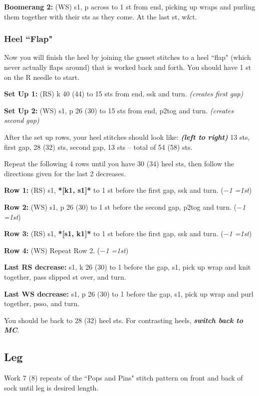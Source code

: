 \documentclass[12pt]{article}
\newcommand{\vocab}[1]{\emph{\textbf{#1}}} %
\newcommand{\rowDir}[1]{\textbf{#1:}} %
\renewcommand{\repeat}[1]{\textbf{*[#1]*}} %
\newcommand{\decrease}[1]{(\emph{$-$#1
	\ifnum#1=1{st}\else{sts}\fi})}
\begin{document}
\begin{multicols}{2}
\rowDir{Boomerang 2} (WS) s1, p across to 1 st from end, picking up wraps and purling them together with their sts as they come. At the last st, w\&t.

\subsubsection*{Heel ``Flap"}
\vspace{-.5em}
Now you will finish the heel by joining the gusset stitches to a heel ``flap" (which never actually flaps around) that is worked back and forth. You should have 1 st on the R needle to start. 

\rowDir{Set Up 1} (RS) k 40 (44) to 15 sts from end, ssk and turn. \emph{(creates first gap)}

\rowDir{Set Up 2} (WS) s1, p 26 (30) to 15 sts from end, p2tog and turn. \emph{(creates second gap)}

\vspace{1em}
After the set up rows, your heel stitches should look like: \vocab{(left to right)} 13 sts, first gap, 28 (32) sts, second gap, 13 sts -- total of 54 (58) sts. 

Repeat the following 4 rows until you have 30 (34) heel sts, then follow the directions given for the last 2 decreases.

\rowDir{Row 1} (RS) s1, \repeat{k1, s1} to 1 st before the first gap, ssk and turn. \decrease{1}

\rowDir{Row 2} (WS) s1, p 26 (30) to 1 st before the second gap, p2tog and turn. \decrease{1}

\rowDir{Row 3} (RS) s1, \repeat{s1, k1} to 1 st before the first gap, ssk and turn. \decrease{1}

\rowDir{Row 4} (WS) Repeat Row 2. \decrease{1}


\vspace{1em}
\rowDir{Last RS decrease} s1, k 26 (30) to 1 before the gap, s1, pick up wrap and knit together, pass slipped st over, and turn. 

\rowDir{Last WS decrease} s1,  p 26 (30) to 1 before the gap, s1, pick up wrap and purl together, psso, and turn.

\vfill
\columnbreak
You should be back to 28 (32) heel sts. For contrasting heels, \vocab{switch back to MC}.


\subsection*{Leg}
Work 7 (8) repeats of the ``Pops and Pins" stitch pattern on front and back of sock until leg is desired length.
\vspace{-1em}
 


\end{multicols}
\end{document}
